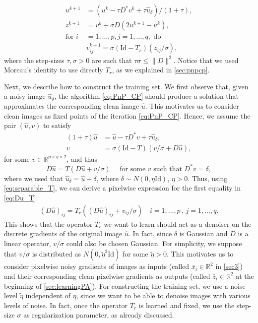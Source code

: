 \documentclass[onefignum,onetabnum]{siamonline250211}
\newcommand{\R}{\mathbb{R}}
\begin{document}
\begin{equation}\label{eq:PnP_CP}
    \begin{aligned}
    u^{k+1} & = (u^k-\tau D^*v^k+\tau\hat u_\delta)/(1+\tau),\\
    z^{k+1} & =  v^k+\sigma D(2u^{k+1}-u^k),\\
    \text{for } i & = 1,\dots,p, j=1,\dots,q, \text{ do }\\ 
    & v_{ij}^{k+1}=\sigma(\mathrm{Id}-T_r)(z_{ij}/\sigma),
    \end{aligned}
\end{equation}
where the step-sizes $\tau, \sigma>0$ are such that $\tau \sigma\leq \|D\|^2$. Notice that we used Moreau's identity to use directly $T_r$, as we explained in \cref{sec:pnpcp}.

Next, we describe how to construct the training set. We first observe that, given a noisy image $\hat u_\delta$, the algorithm \cref{eq:PnP_CP} should produce a solution that approximates the corresponding clean image $\hat u$. This motivates us to consider clean images as fixed points of the iteration \cref{eq:PnP_CP}. Hence, we assume the pair $(\hat u, v)$ to satisfy
\[
\begin{aligned}
(1+\tau)\hat u &=\hat u-\tau D^* v + \tau \hat u_\delta,\\
v & = \sigma (\mathrm{Id}-T)(v/\sigma + D \hat u),
\end{aligned}
\]
for some $v\in\R^{p\times q \times 2}$, and thus
\begin{equation}\label{eq:Du_T}
D \hat u = T(D \hat u + v/\sigma) \quad \text{ for some $v$ such that } D^* v  = \delta,
\end{equation}
where we used that $\hat u_\delta=\hat u + \delta$, where $\delta \sim N(0,\eta \mathrm{Id})$, $\eta>0$.
Thus, using \cref{eq:separable_T}, we can derive a pixelwise expression for the first equality in \cref{eq:Du_T}:
\[\begin{aligned}
(D \hat u)_{ij} = T_r((D \hat u)_{ij} + v_{ij}/\sigma) \quad i=1,\dots,p \, , \, j= 1,\dots , q.
\end{aligned}\]
This shows that the operator $T_r$ we want to learn should act as a denoiser on the discrete gradients of the original image $\hat u$. In fact, since $\delta$ is Gaussian and $D$ is a linear operator, $v/\sigma$ could also be chosen Gaussian. For simplicity, we suppose that $v/\sigma$ is distributed as $N(0,\tilde \eta ^2 \mathrm{Id})$ for some $\tilde \eta>0$. This motivates us to consider pixelwise noisy gradients of images as inputs (called $\bar x_i \in \R^2$ in \cref{sec3}) and their corresponding clean pixelwise gradients as outputs (called $\bar z_i\in \R^2$ at the beginning of \cref{sec:learningPA}). For constructing the training set, we use a noise level $\tilde \eta$ independent of $\eta$, since we want to be able to denoise images with various levels of noise. In fact, once the operator $T_r$ is learned and fixed, we use the step-size $\sigma$ as regularization parameter, as already discussed.
\end{document}
